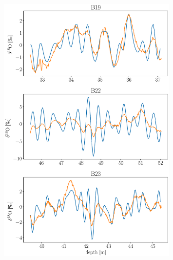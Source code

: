 \documentclass[11pt]{article}
\begin{document}
\begin{figure}
	\centering
	\includegraphics[width=0.8\textwidth]{deconvoluted__B19_B22_B23.eps}
	\label{fig:B19_B22_B23__decon}
	\caption{}
\end{figure}
\end{document}
